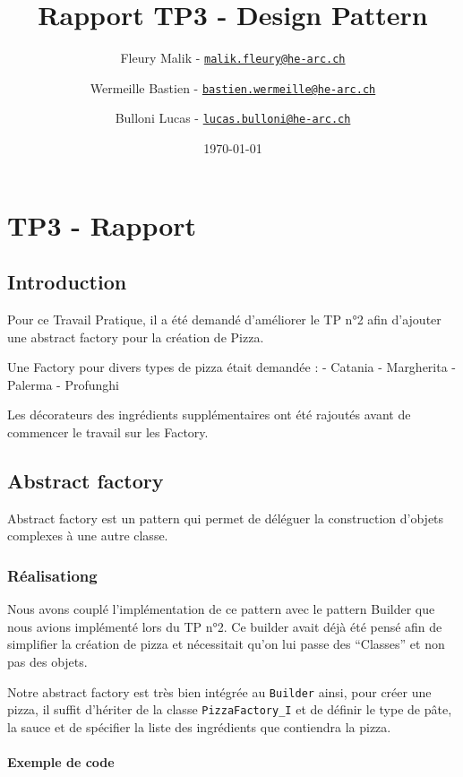 \documentclass[french,]{article}
\title{Rapport TP3 - Design Pattern}
\author{Fleury Malik -
\href{mailto:malik.fleury@he-arc.ch}{\nolinkurl{malik.fleury@he-arc.ch}} \and Wermeille Bastien -
\href{mailto:bastien.wermeille@he-arc.ch}{\nolinkurl{bastien.wermeille@he-arc.ch}} \and Bulloni Lucas -
\href{mailto:lucas.bulloni@he-arc.ch}{\nolinkurl{lucas.bulloni@he-arc.ch}}}
\date{\today}
\let\oldparagraph\paragraph
\renewcommand{\paragraph}[1]{\oldparagraph{#1}\mbox{}}
\begin{document}
\maketitle

{
\setcounter{tocdepth}{5}
\tableofcontents
}
\section{TP3 - Rapport}\label{tp3---rapport}

\subsection{Introduction}\label{introduction}

Pour ce Travail Pratique, il a été demandé d'améliorer le TP n°2 afin
d'ajouter une abstract factory pour la création de Pizza.

Une Factory pour divers types de pizza était demandée : - Catania -
Margherita - Palerma - Profunghi

Les décorateurs des ingrédients supplémentaires ont été rajoutés avant
de commencer le travail sur les Factory.

\subsection{Abstract factory}\label{abstract-factory}

Abstract factory est un pattern qui permet de déléguer la construction
d'objets complexes à une autre classe.

\subsubsection{Réalisationg}\label{ruxe9alisationg}

Nous avons couplé l'implémentation de ce pattern avec le pattern Builder
que nous avions implémenté lors du TP n°2. Ce builder avait déjà été
pensé afin de simplifier la création de pizza et nécessitait qu'on lui
passe des ``Classes'' et non pas des objets.

Notre abstract factory est très bien intégrée au \texttt{Builder} ainsi,
pour créer une pizza, il suffit d'hériter de la classe
\texttt{PizzaFactory\_I} et de définir le type de pâte, la sauce et de
spécifier la liste des ingrédients que contiendra la pizza.

\paragraph{Exemple de code}\label{exemple-de-code}
\end{document}
